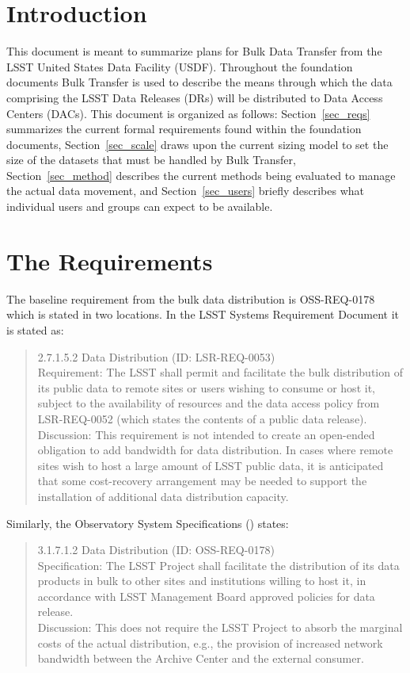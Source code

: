 \section{Introduction}

This document is meant to summarize plans for Bulk Data Transfer from the LSST United States Data 
Facility (USDF).  Throughout the foundation documents Bulk Transfer is used to describe the means 
through which the data comprising the LSST Data Releases (DRs) will be distributed to Data Access 
Centers (DACs).  This document is organized as follows: Section~\ref{sec_reqs} summarizes the 
current formal requirements found within the foundation documents, Section~\ref{sec_scale}
draws upon the current sizing model to set the size of the datasets that must be handled by 
Bulk Transfer, Section~\ref{sec_method} describes the current methods being evaluated to manage 
the actual data movement, and Section~\ref{sec_users} briefly describes what individual users 
and groups can expect to be available.

\section{The Requirements\label{sec_reqs}}

The baseline requirement from the bulk data distribution is OSS-REQ-0178 which is stated in two locations.  
In the LSST Systems Requirement Document  it is stated as:

\begin{quote}
2.7.1.5.2 Data Distribution (ID: LSR-REQ-0053)\\
Requirement: The LSST shall permit and facilitate the bulk distribution of its public data to 
remote sites or users wishing to consume or host it, subject to the availability of resources 
and the data access policy from LSR-REQ-0052 (which states the contents of a public data release).\\
Discussion: This requirement is not intended to create an open-ended obligation to add bandwidth 
for data distribution. In cases where remote sites wish to host a large amount of LSST public data, 
it is anticipated that some cost-recovery arrangement may be needed to support the installation of 
additional data distribution capacity.\\
\end{quote}

Similarly, the Observatory System Specifications () states:
\begin{quote}
3.1.7.1.2 Data Distribution (ID: OSS-REQ-0178)\\
Specification: The LSST Project shall facilitate the distribution of its data products in bulk to 
other sites and institutions willing to host it, in accordance with LSST Management Board approved
policies for data release.\\
Discussion: This does not require the LSST Project to absorb the marginal costs of the actual 
distribution, e.g., the provision of increased network bandwidth between the Archive Center and 
the external consumer.\\
\end{quote}

